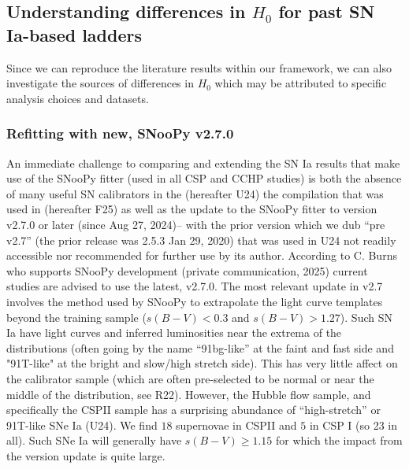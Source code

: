 \subsection{Understanding differences in \texorpdfstring{$H_0$}{H0} for past SN Ia-based ladders}\label{app:sec:SNIa_literature}

Since we can reproduce the literature results within our framework, we can also investigate the sources of differences
in $H_0$ which may be attributed to specific analysis choices and datasets.  

\subsubsection{Refitting with new, SNooPy v2.7.0\label{app:snoopy}}
An immediate challenge to comparing and extending the SN Ia results that make use of the SNooPy fitter (used in all CSP and CCHP studies) is both the absence of many useful SN calibrators in the \citet{2024ApJ...970...72U} (hereafter U24) the compilation that was used in \cite{2025ApJ...985..203F} (hereafter F25) as well as the update to the SNooPy fitter to version v2.7.0 or later (since Aug 27, 2024)-- with the prior version which we dub ``pre v2.7'' (the prior release was 2.5.3 Jan 29, 2020) that was used in U24 not readily accessible nor recommended for further use by its author.  According to C. Burns who supports SNooPy development (private communication, 2025) current studies are advised to use the latest, v2.7.0.  The most relevant update in v2.7 involves the method used by SNooPy to extrapolate the light curve templates beyond the training sample ($s(B-V) < 0.3$ and $s(B-V) > 1.27$).
Such SN Ia have light curves and inferred luminosities near the extrema of the distributions (often going by the name ``91bg-like'' at the faint and fast side and "91T-like" at the bright and slow/high stretch side).  This has very little affect on the calibrator sample (which are often pre-selected to be normal or near the middle of the distribution, see R22).  However, the Hubble flow sample, and specifically the CSPII sample has a surprising abundance of ``high-stretch'' or 91T-like SNe Ia (U24). We find $18$ supernovae in CSPII and $5$ in CSP I (so 23 in all).  Such SNe Ia will generally have $s(B-V) \geq 1.15$ for which the impact from the version update is quite large.
